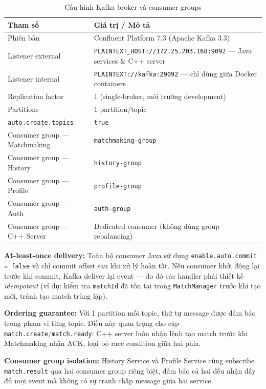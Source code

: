 \documentclass[12pt,a4paper]{report}
\newcommand{\topic}[1]{\texttt{\textcolor{micropurple}{#1}}}
\begin{document}
\begin{table}[H]
\centering
\caption{Cấu hình Kafka broker và consumer groups}
\label{tab:kafkaconfig}
\begin{tabularx}{\textwidth}{lX}
\toprule
\textbf{Tham số} & \textbf{Giá trị / Mô tả} \\
\midrule
Phiên bản & Confluent Platform 7.3 (Apache Kafka 3.3) \\
Listener external & \texttt{PLAINTEXT\_HOST://172.25.203.168:9092} --- Java services \& C++ server \\
Listener internal & \texttt{PLAINTEXT://kafka:29092} --- chỉ dùng giữa Docker containers \\
Replication factor & 1 (single-broker, môi trường development) \\
Partitions & 1 partition/topic \\
\texttt{auto.create.topics} & \texttt{true} \\
Consumer group --- Matchmaking & \texttt{matchmaking-group} \\
Consumer group --- History & \texttt{history-group} \\
Consumer group --- Profile & \texttt{profile-group} \\
Consumer group --- Auth & \texttt{auth-group} \\
Consumer group --- C++ Server & Dedicated consumer (không dùng group rebalancing) \\
\bottomrule
\end{tabularx}
\end{table}

\textbf{At-least-once delivery:} Toàn bộ consumer Java sử dụng
\texttt{enable.auto.commit = false} và chỉ commit offset sau khi xử lý hoàn tất. Nếu
consumer khởi động lại trước khi commit, Kafka deliver lại event --- do đó các handler
phải thiết kế \textit{idempotent} (ví dụ: kiểm tra \texttt{matchId} đã tồn tại trong
\texttt{MatchManager} trước khi tạo mới, tránh tạo match trùng lặp).

\textbf{Ordering guarantee:} Với 1 partition mỗi topic, thứ tự message được đảm bảo trong
phạm vi từng topic. Điều này quan trọng cho cặp \topic{match.create}/\topic{match.ready}:
C++ server luôn nhận lệnh tạo match trước khi Matchmaking nhận ACK, loại bỏ race condition
giữa hai phía.

\textbf{Consumer group isolation:} History Service và Profile Service cùng subscribe
\topic{match.result} qua hai consumer group riêng biệt, đảm bảo cả hai đều nhận đầy đủ
mọi event mà không có sự tranh chấp message giữa hai service.
\end{document}
